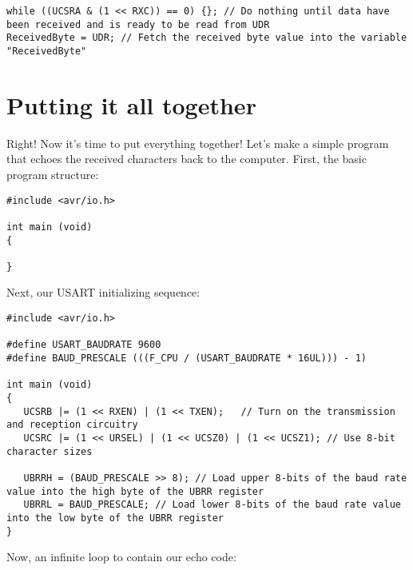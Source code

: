 \documentclass[a4paper,oneside]{book}
\begin{document}
\begin{center}
\begin{lstlisting}
while ((UCSRA & (1 << RXC)) == 0) {}; // Do nothing until data have been received and is ready to be read from UDR
ReceivedByte = UDR; // Fetch the received byte value into the variable "ReceivedByte"
\end{lstlisting}
\end{center}

\chapter{Putting it all together}

Right! Now it's time to put everything together! Let's make a simple program that echoes the received characters back to the computer. First, the basic program structure:

\begin{center}
\begin{lstlisting}
#include <avr/io.h>

int main (void)
{

}
\end{lstlisting}
\end{center}

Next, our USART initializing sequence:

\begin{center}
\begin{lstlisting}
#include <avr/io.h>

#define USART_BAUDRATE 9600
#define BAUD_PRESCALE (((F_CPU / (USART_BAUDRATE * 16UL))) - 1)

int main (void)
{
   UCSRB |= (1 << RXEN) | (1 << TXEN);   // Turn on the transmission and reception circuitry
   UCSRC |= (1 << URSEL) | (1 << UCSZ0) | (1 << UCSZ1); // Use 8-bit character sizes

   UBRRH = (BAUD_PRESCALE >> 8); // Load upper 8-bits of the baud rate value into the high byte of the UBRR register
   UBRRL = BAUD_PRESCALE; // Load lower 8-bits of the baud rate value into the low byte of the UBRR register
}
\end{lstlisting}
\end{center}

Now, an infinite loop to contain our echo code:
\end{document}
